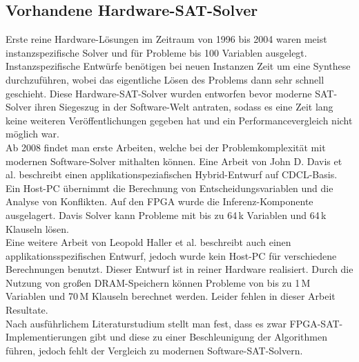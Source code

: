 \subsection{Vorhandene Hardware-SAT-Solver}
Erste reine Hardware-Lösungen im Zeitraum von 1996 bis 2004
waren meist instanzspezifische Solver und für Probleme bis 
100 Variablen ausgelegt. Instanzspezifische Entwürfe benötigen 
bei neuen Instanzen Zeit um eine Synthese durchzuführen, wobei 
das eigentliche Lösen des Problems dann sehr schnell geschieht.
Diese Hardware-SAT-Solver wurden entworfen bevor
moderne SAT-Solver \cite{manthey:2010} ihren Siegeszug in der
Software-Welt antraten, sodass es eine Zeit lang keine weiteren Veröffentlichungen 
gegeben hat und ein Performancevergleich nicht möglich war.\\
Ab 2008 findet man erste Arbeiten, welche bei der Problemkomplexität 
mit modernen Software-Solver mithalten können. 
Eine Arbeit von John D. Davis et al. \cite{davis:2008} 
beschreibt einen applikationspeziafischen Hybrid-Entwurf auf CDCL-Basis.
Ein Host-PC übernimmt die Berechnung von Entscheidungsvariablen und die Analyse 
von Konflikten. Auf den FPGA wurde die Inferenz-Komponente ausgelagert. 
Davis Solver kann Probleme mit bis zu 64\,k Variablen und 64\,k Klauseln lösen.\\
Eine weitere Arbeit von Leopold Haller et al. \cite{haller:2010} 
beschreibt auch einen applikationsspezifischen Entwurf, jedoch wurde 
kein Host-PC für verschiedene Berechnungen benutzt. Dieser   
Entwurf ist in reiner Hardware realisiert. Durch die Nutzung von großen 
DRAM-Speichern können Probleme von bis zu 1\,M Variablen und 70\,M 
Klauseln berechnet werden. Leider fehlen in dieser Arbeit Resultate.\\
Nach ausführlichem Literaturstudium stellt man fest,
dass es zwar FPGA-SAT-Implementierungen gibt und diese
zu einer Beschleunigung der Algorithmen führen, jedoch fehlt
der Vergleich zu modernen Software-SAT-Solvern.\\
